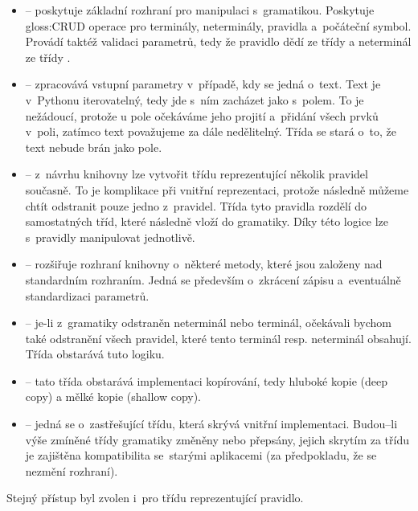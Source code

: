 		\begin{itemize}
			\item {} -- poskytuje základní rozhraní pro manipulaci s~gramatikou. Poskytuje \gls{gloss:CRUD} operace pro terminály, neterminály, pravidla a~počáteční symbol. Provádí taktéž validaci parametrů, tedy že pravidlo dědí ze třídy  a neterminál ze třídy .
			\item {} -- zpracovává vstupní parametry v~případě, kdy se jedná o~text. Text je v~Pythonu iterovatelný, tedy jde s~ním zacházet jako s~polem. To je nežádoucí, protože u pole očekáváme jeho projití a~přidání všech prvků v~poli, zatímco text považujeme za dále nedělitelný. Třída  se stará o~to, že text nebude brán jako pole.
			\item {} -- z~návrhu knihovny lze vytvořit třídu reprezentující několik pravidel současně. To je komplikace při vnitřní reprezentaci, protože následně můžeme chtít odstranit pouze jedno z~pravidel. Třída  tyto pravidla rozdělí do samostatných tříd, které následně vloží do gramatiky. Díky této logice lze s~pravidly manipulovat jednotlivě.
			\item {} -- rozšiřuje rozhraní knihovny o~některé metody, které jsou založeny nad standardním rozhraním. Jedná se především o~zkrácení zápisu a~eventuálně standardizaci parametrů.
			\item {} -- je-li z~gramatiky odstraněn neterminál nebo terminál, očekávali bychom také odstranění všech pravidel, které tento terminál resp. neterminál obsahují. Třída  obstarává tuto logiku.
			\item {} -- tato třída obstarává implementaci kopírování, tedy hluboké kopie (deep copy) a mělké kopie (shallow copy).
			\item {} -- jedná se o~zastřešující třídu, která skrývá vnitřní implementaci. Budou--li výše zmíněné třídy gramatiky změněny nebo přepsány, jejich skrytím za třídu  je zajištěna kompatibilita se~starými aplikacemi (za předpokladu, že se nezmění rozhraní).
		\end{itemize}
	
		Stejný přístup byl zvolen i~pro třídu  reprezentující pravidlo.
		
